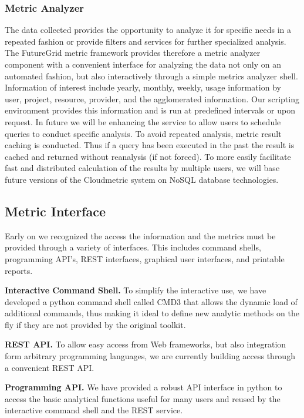 \documentclass{tex/sig-alternate}
\begin{document}
{\subsubsection{Metric Analyzer}

The data collected provides the opportunity to analyze it for specific
needs in a repeated fashion or provide filters and services for
further specialized analysis. The FutureGrid metric framework provides
therefore a metric analyzer component with a convenient interface for
analyzing the data not only on an automated fashion, but also
interactively through a simple metrics analyzer shell. Information of
interest include yearly, monthly, weekly, usage information by user,
project, resource, provider, and the agglomerated information. Our
scripting environment provides this information and is run at
predefined intervals or upon request. In future we will be enhancing
the service to allow users to schedule queries to conduct specific
analysis. To avoid repeated analysis, metric result caching is
conducted. Thus if a query has been executed in the past the result is
cached and returned without reanalysis (if not forced). To more easily
facilitate fast and distributed calculation of the results by multiple
users, we will base future versions of the Cloudmetric system on NoSQL
database technologies. 

\subsection{Metric Interface}

Early on we recognized the access the information and the metrics must
be provided through a variety of interfaces. This includes command
shells, programming API's, REST interfaces, graphical user interfaces,
and printable reports.

{\bf Interactive Command Shell.} To simplify the interactive use,
we have developed a python command shell called CMD3 that allows the
dynamic load of additional commands, thus making it ideal to define
new analytic methods on the fly if they are not provided by the
original toolkit.

{\bf REST API.} To allow easy access from Web frameworks, but
also integration form arbitrary programming languages, we are
currently building access through a convenient REST API.

{\bf Programming API.} We have provided a robust API interface
in python to access the basic  analytical functions useful for many
users and reused by the interactive command shell and the REST service.

}
\end{document}
